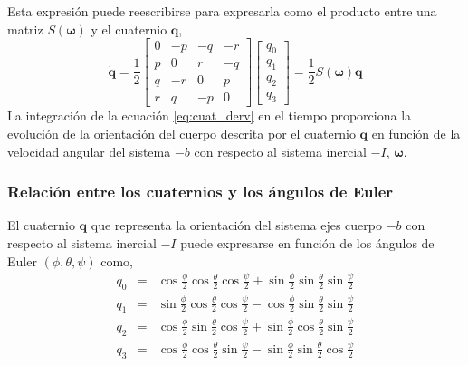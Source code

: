 \documentclass[a4paper,12pt]{book}
\begin{document}
Esta expresión puede reescribirse para expresarla como el producto entre una matriz $S(\mathbf{\omega})$ y el cuaternio $\mathbf{q}$,
\begin{equation}\label{eq:cuat_derv}
    \dot{\mathbf{q}} = \frac{1}{2}\begin{bmatrix}0 & -p & -q & -r \\ p & 0 & r & -q \\ q & -r & 0 & p \\ r & q & -p & 0  \end{bmatrix}\begin{bmatrix} q_0 \\ q_1\\q_2\\q_3    \end{bmatrix} = \frac{1}{2}S(\mathbf{\omega})\mathbf{q}
\end{equation}
La integración de la ecuación \eqref{eq:cuat_derv} en el tiempo proporciona la evolución de la orientación del cuerpo descrita por el cuaternio $\mathbf{q}$ en función de la velocidad angular del sistema $-b$ con respecto al sistema inercial $-I$, $\mathbf{\omega}$.

\subsubsection{Relación entre los cuaternios y los ángulos de Euler}
 
El cuaternio $\mathbf{q}$ que representa la orientación del sistema ejes cuerpo $-b$ con respecto al sistema inercial $-I$ puede expresarse en función de los ángulos de Euler $(\phi,\theta, \psi)$ como,
\begin{eqnarray}
    q_0 & = & \cos\frac{\phi}{2}\cos\frac{\theta}{2}\cos\frac{\psi}{2} + \sin\frac{\phi}{2}\sin\frac{\theta}{2}\sin\frac{\psi}{2}\\
    q_1 & = & \sin\frac{\phi}{2}\cos\frac{\theta}{2}\cos\frac{\psi}{2} - \cos\frac{\phi}{2}\sin\frac{\theta}{2}\sin\frac{\psi}{2}\\
    q_2 & = & \cos\frac{\phi}{2}\sin\frac{\theta}{2}\cos\frac{\psi}{2} + \sin\frac{\phi}{2}\cos\frac{\theta}{2}\sin\frac{\psi}{2}\\
    q_3 & = & \cos\frac{\phi}{2}\cos\frac{\theta}{2}\sin\frac{\psi}{2} - \sin\frac{\phi}{2}\sin\frac{\theta}{2}\cos\frac{\psi}{2}
\end{eqnarray}
\end{document}
